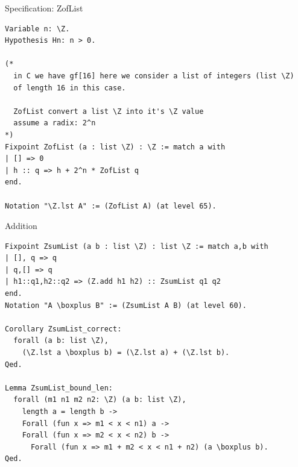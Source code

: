 \documentclass[8pt]{beamer}
\begin{document}
\begin{frame}[fragile]{Specification: ZofList}
  \begin{center}
\begin{lstlisting}[language=Coq, caption=ZofList, label=cod:languageC81]
Variable n: \Z.
Hypothesis Hn: n > 0.

(*
  in C we have gf[16] here we consider a list of integers (list \Z)
  of length 16 in this case.

  ZofList convert a list \Z into it's \Z value
  assume a radix: 2^n
*)
Fixpoint ZofList (a : list \Z) : \Z := match a with
| [] => 0
| h :: q => h + 2^n * ZofList q
end.

Notation "\Z.lst A" := (ZofList A) (at level 65).
\end{lstlisting}






  \end{center}
\end{frame}


%
%

\begin{frame}[fragile]{Addition}
  \begin{center}
\begin{lstlisting}[language=Coq, caption=Addition, label=cod:languageC91]
Fixpoint ZsumList (a b : list \Z) : list \Z := match a,b with
| [], q => q
| q,[] => q
| h1::q1,h2::q2 => (Z.add h1 h2) :: ZsumList q1 q2
end.
Notation "A \boxplus B" := (ZsumList A B) (at level 60).

Corollary ZsumList_correct:
  forall (a b: list \Z),
    (\Z.lst a \boxplus b) = (\Z.lst a) + (\Z.lst b).
Qed.

Lemma ZsumList_bound_len:
  forall (m1 n1 m2 n2: \Z) (a b: list \Z),
    length a = length b ->
    Forall (fun x => m1 < x < n1) a ->
    Forall (fun x => m2 < x < n2) b ->
      Forall (fun x => m1 + m2 < x < n1 + n2) (a \boxplus b).
Qed.
\end{lstlisting}

  \end{center}
\end{frame}
\end{document}

